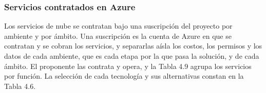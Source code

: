 \documentclass[11pt]{article}
\begin{document}
\subsubsection{Servicios contratados en Azure}

Los servicios de nube se contratan bajo una suscripción del proyecto por ambiente y por ámbito. Una suscripción es la cuenta de Azure en que se contratan y se cobran los servicios, y separarlas aísla los costos, los permisos y los datos de cada ambiente, que es cada etapa por la que pasa la solución, y de cada ámbito. El proponente las contrata y opera, y la Tabla 4.9 agrupa los servicios por función. La selección de cada tecnología y sus alternativas constan en la Tabla 4.6.

\par\vspace{0pt plus 10\baselineskip}\vspace{0pt plus -10\baselineskip}
\end{document}
